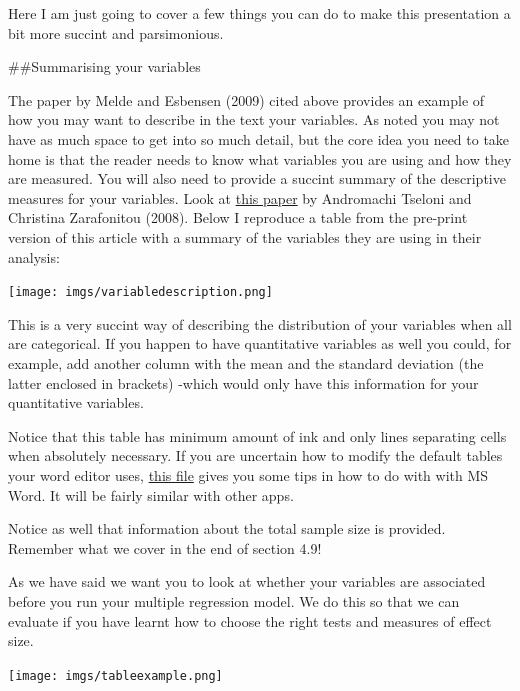 \documentclass[
]{book}
\begin{document}
Here I am just going to cover a few things you can do to make this presentation a bit more succint and parsimonious.

\#\#Summarising your variables

The paper by Melde and Esbensen (2009) cited above provides an example of how you may want to describe in the text your variables. As noted you may not have as much space to get into so much detail, but the core idea you need to take home is that the reader needs to know what variables you are using and how they are measured. You will also need to provide a succint summary of the descriptive measures for your variables. Look at \href{https://journals.sagepub.com/doi/10.1177/1477370808095123}{this paper} by Andromachi Tseloni and Christina Zarafonitou (2008). Below I reproduce a table from the pre-print version of this article with a summary of the variables they are using in their analysis:

\texttt{[image: imgs/variabledescription.png]}

This is a very succint way of describing the distribution of your variables when all are categorical. If you happen to have quantitative variables as well you could, for example, add another column with the mean and the standard deviation (the latter enclosed in brackets) -which would only have this information for your quantitative variables.

Notice that this table has minimum amount of ink and only lines separating cells when absolutely necessary. If you are uncertain how to modify the default tables your word editor uses, \href{https://github.com/jjmedinaariza/modelling_book/blob/master/files_docs/wordtables.pdf}{this file} gives you some tips in how to do with with MS Word. It will be fairly similar with other apps.

Notice as well that information about the total sample size is provided. Remember what we cover in the end of section 4.9!

As we have said we want you to look at whether your variables are associated before you run your multiple regression model. We do this so that we can evaluate if you have learnt how to choose the right tests and measures of effect size.

\texttt{[image: imgs/tableexample.png]}
\end{document}
